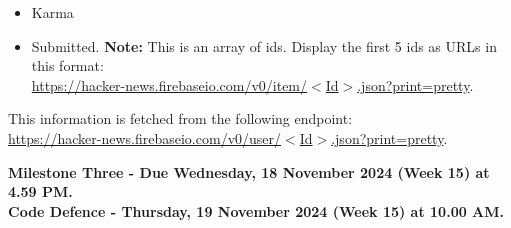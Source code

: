 \documentclass{article}
\begin{document}
\begin{itemize}
\begin{itemize}
\begin{itemize}
		\item Karma
		\item Submitted. \textbf{Note:} This is an array of ids. Display the first 5 ids as URLs in this format:\\
		 \href{https://hacker-news.firebaseio.com/v0/item/$<$Id$>$.json?print=pretty}{https://hacker-news.firebaseio.com/v0/item/$<$Id$>$.json?print=pretty}.
	\end{itemize}
	This information is fetched from the following endpoint:\\
	\href{https://hacker-news.firebaseio.com/v0/user/$<$Id$>$.json?print=pretty}{https://hacker-news.firebaseio.com/v0/user/$<$Id$>$.json?print=pretty}.
	\end{itemize}
\end{itemize}
	\textbf{Milestone Three - Due Wednesday, 18 November 2024 (Week 15) at 4.59 PM. \\ Code Defence - Thursday, 19 November 2024 (Week 15) at 10.00 AM.}
\end{document}
